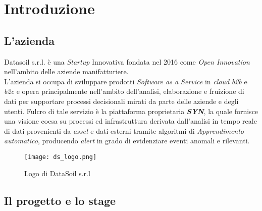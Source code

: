 
\chapter{Introduzione}
\label{cap:introduzione}


\section{L'azienda}

Datasoil s.r.l. è una \textit{Startup} Innovativa fondata nel 2016 come \textit{Open Innovation} nell'ambito delle aziende manifatturiere.\\
L'azienda si occupa di sviluppare prodotti \textit{Software as a Service} in \textit{cloud} \textit{\gls{b2b}} e \textit{\gls{b2c}} e opera principalmente nell'ambito dell'analisi, elaborazione e fruizione di dati per supportare processi decisionali mirati da parte delle aziende e degli utenti. Fulcro di tale servizio è la piattaforma proprietaria \textbf{\textit{SYN}}, la quale fornisce una visione coesa su processi ed infrastruttura derivata dall'analisi in tempo reale di dati provenienti da \textit{asset} e dati esterni tramite algoritmi di \textit{\gls{Apprendimento automatico}}, producendo \textit{alert} in grado di evidenziare eventi anomali e rilevanti.

\begin{figure}[!h] 
    \centering 
    \texttt{[image: ds\_logo.png]} 
    \caption{Logo di DataSoil s.r.l}
\end{figure}

\section{Il progetto e lo stage}

